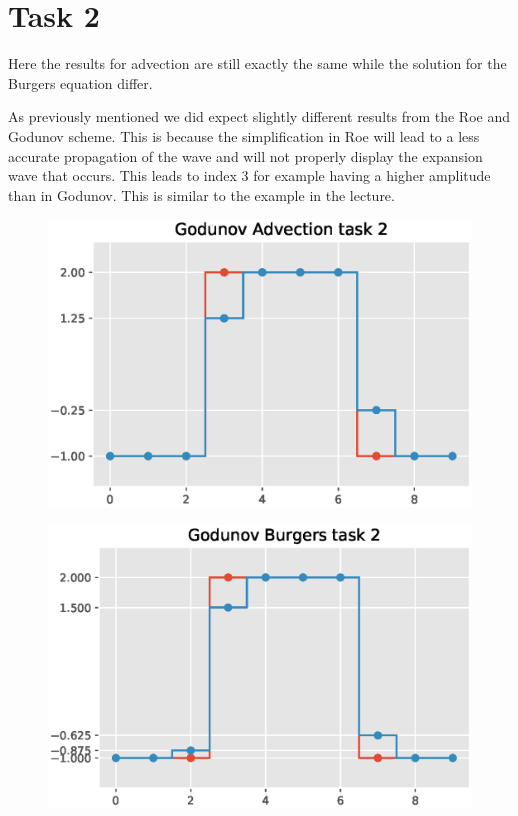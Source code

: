 \documentclass{article}
\begin{document}
\section*{Task 2}
Here the results for advection are still exactly the same while the solution for the Burgers equation differ.

As previously mentioned we did expect slightly different results from the Roe and Godunov scheme. This is because the simplification in Roe will lead to a less accurate propagation of the wave and will not properly display the expansion wave that occurs. This leads to index 3 for example having a higher amplitude than in Godunov. This is similar to the example in the lecture.

\begin{figure}[H]
  \centering
  \includegraphics[width=1\linewidth]{pics/Godunovadvection2.eps}
  \label{fig:perf}
 \end{figure}

\begin{figure}[H]
  \centering
  \includegraphics[width=1\linewidth]{pics/Godunovburgers2.eps}
  \label{fig:perf}
 \end{figure}
\end{document}
